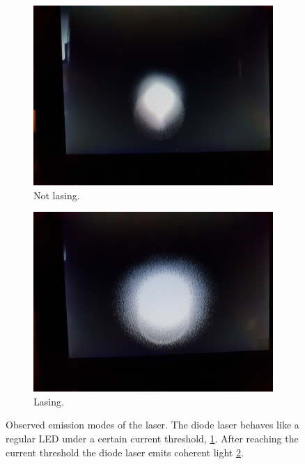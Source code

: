 \begin{figure}
  \centering
      \begin{subfigure}{0.48\textwidth}
          \centering
          \includegraphics[width = \textwidth]{./content/images/diodelaser_not_lasering.jpg}
          \caption{Not lasing.}
          \label{fig:not_lasering}
      \end{subfigure}
      \begin{subfigure}{0.48\textwidth}
          \centering
          \includegraphics[width = \textwidth]{./content/images/diodelaser_lasering.jpg}
          \caption{Lasing.}
          \label{fig:lasering}
      \end{subfigure}
  \caption{Observed emission modes of the laser. The diode laser behaves like a regular
  LED under a certain current threshold, \ref{fig:not_lasering}. After reaching the
  current threshold the diode laser emits coherent light \ref{fig:lasering}. }
\label{fig: emission_modes}
\end{figure}
